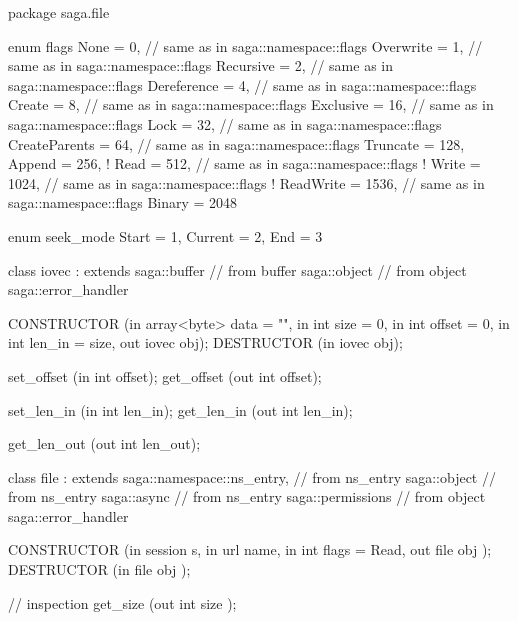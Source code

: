  \begin{myspec}
  package saga.file 
  { 
    enum flags 
    { 
      None           =    0, // same as in saga::namespace::flags 
      Overwrite      =    1, // same as in saga::namespace::flags
      Recursive      =    2, // same as in saga::namespace::flags 
      Dereference    =    4, // same as in saga::namespace::flags 
      Create         =    8, // same as in saga::namespace::flags 
      Exclusive      =   16, // same as in saga::namespace::flags
      Lock           =   32, // same as in saga::namespace::flags 
      CreateParents  =   64, // same as in saga::namespace::flags 
      Truncate       =  128, 
      Append         =  256, 
!     Read           =  512, // same as in saga::namespace::flags 
!     Write          = 1024, // same as in saga::namespace::flags 
!     ReadWrite      = 1536, // same as in saga::namespace::flags 
      Binary         = 2048 
    }
 
 
    enum seek_mode
    {
      Start      =   1,
      Current    =   2,
      End        =   3
    }
 
 
    class iovec : extends saga::buffer
               // from buffer saga::object
               // from object saga::error_handler
    {
      CONSTRUCTOR (in array<byte>          data   = "",
                   in    int               size   = 0,
                   in    int               offset = 0,
                   in    int               len_in = size,
                   out   iovec             obj);
      DESTRUCTOR  (in    iovec             obj);
 
      set_offset  (in    int               offset);
      get_offset  (out   int               offset);
 
      set_len_in  (in    int               len_in);
      get_len_in  (out   int               len_in);
 
      get_len_out (out   int               len_out);
    }
 
    class file : extends        saga::namespace::ns_entry,
              // from ns_entry  saga::object
              // from ns_entry  saga::async
              // from ns_entry  saga::permissions
              // from object    saga::error_handler
    {
      CONSTRUCTOR (in    session           s,
                   in    url               name,
                   in    int               flags = Read,
                   out   file              obj      );
      DESTRUCTOR  (in    file              obj      );
 
      // inspection
      get_size    (out   int               size     );
 
}}
\end{myspec}
